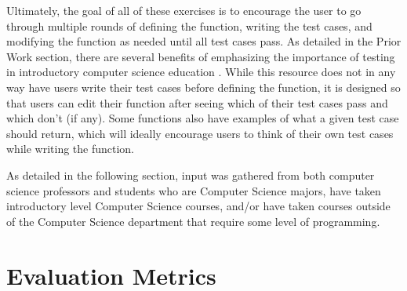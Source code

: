 \documentclass[10pt,twocolumn]{article}
\begin{document}
Ultimately, the goal of all of these exercises is to encourage the user to go through multiple rounds of defining the function, writing the test cases, and modifying the function as needed until all test cases pass. As detailed in the Prior Work section, there are several benefits of emphasizing the importance of testing in introductory computer science education \cite{Test-first}\cite{Test-driven}\cite{Teaching}. While this resource does not in any way have users write their test cases before defining the function, it is designed so that users can edit their function after seeing which of their test cases pass and which don't (if any). Some functions also have examples of what a given test case should return, which will ideally encourage users to think of their own test cases while writing the function.

As detailed in the following section, input was gathered from both computer science professors and students who are Computer Science majors, have taken introductory level Computer Science courses, and/or have taken courses outside of the Computer Science department that require some level of programming.

\section{Evaluation Metrics}
\end{document}

